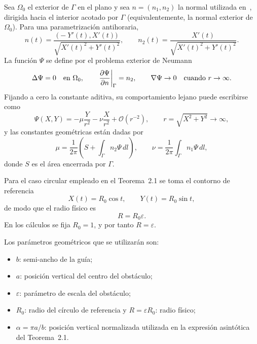 \documentclass[11pt]{article}
\begin{document}
Sea \(\Omega_0\) el exterior de \(\Gamma\) en el plano y sea \(n=(n_1,n_2)\) la normal utilizada en~\cite{Zhevandrov2025}, dirigida hacia el interior acotado por \(\Gamma\) (equivalentemente, la normal exterior de \(\Omega_0\)). Para una parametrización antihoraria,
\begin{equation}
n(t)=
\frac{\bigl(-Y'(t),X'(t)\bigr)}{\sqrt{X'(t)^2+Y'(t)^2}},
\qquad
n_2(t)=\frac{X'(t)}{\sqrt{X'(t)^2+Y'(t)^2}}.
\end{equation}
La función \(\Psi\) se define por el problema exterior de Neumann
\begin{equation}
\Delta\Psi=0\quad\text{en }\Omega_0,
\qquad
\left.\pdv{\Psi}{n}\right|_\Gamma=n_2,
\qquad
\nabla\Psi\to0
\quad\text{cuando }r\to\infty.
\label{eq:Psi_neumann}
\end{equation}
Fijando a cero la constante aditiva, su comportamiento lejano puede escribirse como
\begin{equation}
\Psi(X,Y)
=
-\mu\frac{Y}{r^2}
-\nu\frac{X}{r^2}
+\mathcal{O}(r^{-2}),
\qquad
r=\sqrt{X^2+Y^2}\to\infty,
\end{equation}
y las constantes geométricas están dadas por
\begin{equation}
\mu=
\frac{1}{2\pi}
\left(
S+\int_\Gamma n_2\Psi\,dl
\right),
\qquad
\nu=
\frac{1}{2\pi}
\int_\Gamma n_1\Psi\,dl,
\label{eq:mu_nu_definitions}
\end{equation}
donde \(S\) es el área encerrada por \(\Gamma\).

Para el caso circular empleado en el Teorema~2.1 se toma el contorno de referencia
\[
X(t)=R_0\cos t,
\qquad
Y(t)=R_0\sin t,
\]
de modo que el radio físico es
\begin{equation}
R=R_0\varepsilon.
\end{equation}
En los cálculos se fija \(R_0=1\), y por tanto \(R=\varepsilon\).

Los parámetros geométricos que se utilizarán son:
\begin{itemize}
    \item \(b\): semi-ancho de la guía;
    \item \(a\): posición vertical del centro del obstáculo;
    \item \(\varepsilon\): parámetro de escala del obstáculo;
    \item \(R_0\): radio del círculo de referencia y \(R=\varepsilon R_0\): radio físico;
    \item \(\alpha=\pi a/b\): posición vertical normalizada utilizada en la expresión asintótica del Teorema~2.1.
\end{itemize}
\end{document}
